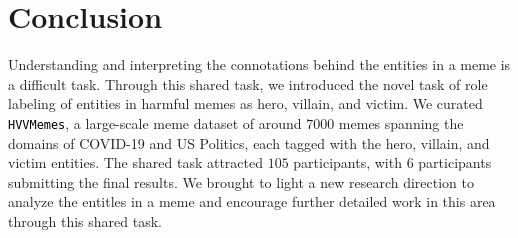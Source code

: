 \documentclass[11pt]{article}
\newcommand{\dataset}{\textcolor{black}{\texttt{HVVMemes}}}
\newcommand{\model}{\texttt{MeRaiM}}
\begin{document}
\section{Conclusion}
Understanding and interpreting the connotations behind the entities in a meme is a difficult task. Through this shared task, we introduced the novel task of role labeling of entities in harmful memes as hero, villain, and victim. We curated \dataset, a large-scale meme dataset of around $7000$ memes spanning the domains of COVID-19 and US Politics, each tagged with the hero, villain, and victim entities. The shared task attracted $105$ participants, with $6$ participants submitting the final results. We brought to light a new research direction to analyze the entitles in a meme and encourage further detailed work in this area through this shared task.








\end{document}
